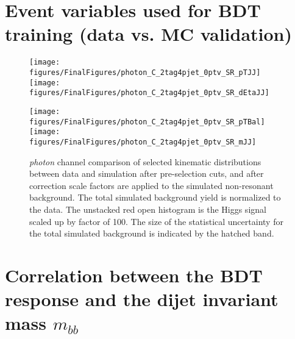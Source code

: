 \documentclass[PAPER, american,coverpage,texlive=2016, english]{\ATLASLATEXPATH atlasdoc}
\providecommand{\DIFaddbeginFL}{} %
\providecommand{\DIFaddendFL}{} %
\providecommand{\DIFdelbeginFL}{} %
\providecommand{\DIFdelendFL}{} %
\begin{document}
\clearpage

\section{Event variables used for BDT training (data vs. MC validation)}
\begin{figure}[htbp]
  \centering

  \DIFdelbeginFL %
\DIFdelendFL \DIFaddbeginFL \texttt{[image: figures/FinalFigures/photon\_C\_2tag4pjet\_0ptv\_SR\_pTJJ]}
  \texttt{[image: figures/FinalFigures/photon\_C\_2tag4pjet\_0ptv\_SR\_dEtaJJ]}

\DIFaddendFL 

  \DIFdelbeginFL %
\DIFdelendFL \DIFaddbeginFL \texttt{[image: figures/FinalFigures/photon\_C\_2tag4pjet\_0ptv\_SR\_pTBal]}
  \texttt{[image: figures/FinalFigures/photon\_C\_2tag4pjet\_0ptv\_SR\_mJJ]}

\DIFaddendFL 

  \caption{\textit{photon} channel comparison of selected kinematic distributions between data and simulation after pre-selection cuts, and after correction scale factors are applied to the simulated non-resonant background. The total simulated  background yield is normalized to the data. The unstacked red open histogram is the Higgs signal scaled up by factor of 100. The size of the statistical uncertainty for the total simulated background is indicated by the hatched band.}
  \label{fig:bdtvar3}
\end{figure}


\section{Correlation between the BDT response and the dijet invariant mass $m_{bb}$}
\end{document}
